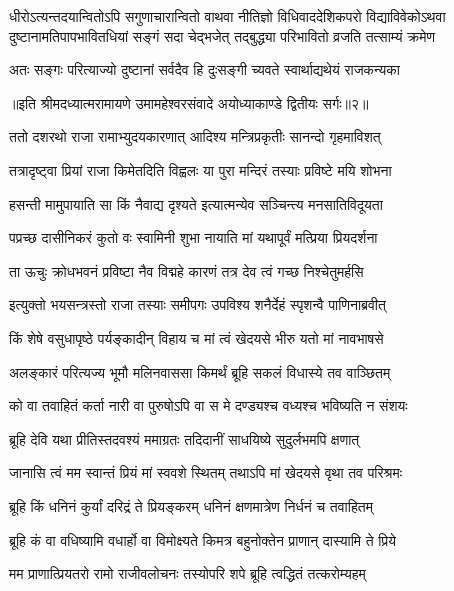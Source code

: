\fourlineindentedshloka
{धीरोऽत्यन्तदयान्वितोऽपि सगुणाचारान्वितो वाथवा}
{नीतिज्ञो विधिवाददेशिकपरो विद्याविवेकोऽथवा}
{दुष्टानामतिपापभावितधियां सङ्गं सदा चेद्भजेत्}
{तद्बुद्ध्या परिभावितो व्रजति तत्साम्यं क्रमेण} %

\twolineshloka
{अतः सङ्गः परित्याज्यो दुष्टानां सर्वदैव हि}
{दुःसङ्गी च्यवते स्वार्थाद्यथेयं राजकन्यका} %

{॥इति श्रीमदध्यात्मरामायणे उमामहेश्वरसंवादे
अयोध्याकाण्डे द्वितीयः सर्गः॥२॥
}




\twolineshloka
{ततो दशरथो राजा रामाभ्युदयकारणात्}
{आदिश्य मन्त्रिप्रकृतीः सानन्दो गृहमाविशत्} %

\twolineshloka
{तत्रादृष्ट्वा प्रियां राजा किमेतदिति विह्वलः}
{या पुरा मन्दिरं तस्याः प्रविष्टे मयि शोभना} %

\twolineshloka
{हसन्ती मामुपायाति सा किं नैवाद्य दृश्यते}
{इत्यात्मन्येव सञ्चिन्त्य मनसातिविदूयता} %

\twolineshloka
{पप्रच्छ दासीनिकरं कुतो वः स्वामिनी शुभा}
{नायाति मां यथापूर्वं मत्प्रिया प्रियदर्शना} %

\twolineshloka
{ता ऊचुः क्रोधभवनं प्रविष्टा नैव विद्महे}
{कारणं तत्र देव त्वं गच्छ निश्चेतुमर्हसि} %

\twolineshloka
{इत्युक्तो भयसन्त्रस्तो राजा तस्याः समीपगः}
{उपविश्य शनैर्देहं स्पृशन्वै पाणिनाब्रवीत्} %

\twolineshloka
{किं शेषे वसुधापृष्ठे पर्यङ्कादीन् विहाय च}
{मां त्वं खेदयसे भीरु यतो मां नावभाषसे} %

\twolineshloka
{अलङ्कारं परित्यज्य भूमौ मलिनवाससा}
{किमर्थं ब्रूहि सकलं विधास्ये तव वाञ्छितम्} %

\twolineshloka
{को वा तवाहितं कर्ता नारी वा पुरुषोऽपि वा}
{स मे दण्ड्यश्च वध्यश्च भविष्यति न संशयः} %

\twolineshloka
{ब्रूहि देवि यथा प्रीतिस्तदवश्यं ममाग्रतः}
{तदिदानीं साधयिष्ये सुदुर्लभमपि क्षणात्} %

\twolineshloka
{जानासि त्वं मम स्वान्तं प्रियं मां स्ववशे स्थितम्}
{तथाऽपि मां खेदयसे वृथा तव परिश्रमः} %

\twolineshloka
{ब्रूहि किं धनिनं कुर्यां दरिद्रं ते प्रियङ्करम्}
{धनिनं क्षणमात्रेण निर्धनं च तवाहितम्} %

\twolineshloka
{ब्रूहि कं वा वधिष्यामि वधार्हो वा विमोक्ष्यते}
{किमत्र बहुनोक्तेन प्राणान् दास्यामि ते प्रिये} %

\twolineshloka
{मम प्राणात्प्रियतरो रामो राजीवलोचनः}
{तस्योपरि शपे ब्रूहि त्वद्धितं तत्करोम्यहम्} %

